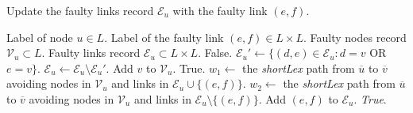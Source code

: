 \begin{algorithm}
\caption[Update the faulty links record]{Update the faulty links record $\mathcal{E}_u$ with the faulty link $(e,f)$.}
\label{al:linkf_rec}
\begin{algorithmic}[1]
\REQUIRE Label of node $u\in L$.
\REQUIRE Label of the faulty link $(e,f)\in L \times L$.
\REQUIRE Faulty nodes record $\mathcal{V}_u \subset L$.
\REQUIRE Faulty links record $\mathcal{E}_u \subset L\times L$.
        \RETURN False.
    \ENDIF
    \STATE $\mathcal{E}_u'\leftarrow \{(d,e)\in\mathcal{E}_u :d=v$ OR $ e=v\}$.
        \STATE $\mathcal{E}_u\leftarrow \mathcal{E}_u\setminus \mathcal{E}_u'$.
        \STATE Add $v$ to $\mathcal{V}_u$.
        \RETURN True.
    \ENDIF
    \ENDFOR
        \STATE $w_1\leftarrow$ the \textit{shortLex} path from $\overline{u}$ to $\overline{v}$ avoiding nodes in $\mathcal{V}_{u}$ and links in $\mathcal{E}_{u}\cup \{(e,f)\}$. 
        \STATE $w_2\leftarrow$ the \textit{shortLex} path from $\overline{u}$ to $\overline{v}$ avoiding nodes in $\mathcal{V}_{u}$ and links in $\mathcal{E}_{u}\setminus \{(e,f)\}$. 
    		\STATE Add $(e,f)$ to $\mathcal{E}_{u}$.
        	\RETURN \textit{True}.
    	\ENDIF
    \ENDFOR
\end{algorithmic}
\end{algorithm}